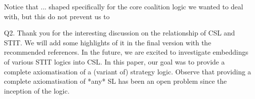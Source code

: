 Notice that ... shaped specifically for the core coalition logic we wanted to deal with, but this do not prevent us to 

Q2. Thank you for the interesting discussion on the relationship of CSL and STIT. We will add some highlights of it in the final version with the recommended references. In the future, we are excited to investigate embeddings of various STIT logics into CSL.
In this paper, our goal was to provide a complete axiomatisation of a (variant of) strategy logic. Observe that providing a complete axiomatisation of *any* SL has been an open problem since the inception of the logic. 